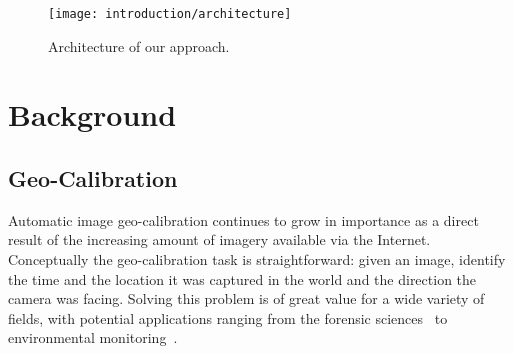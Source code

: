 \begin{figure}
  \centering
  \texttt{[image: introduction/architecture]}
  \caption{Architecture of our approach.}
  \label{fig:intro:architecture}
\end{figure}

\section{Background}

\subsection{Geo-Calibration}
%
Automatic image geo-calibration continues to grow in importance as a
direct result of the increasing amount of imagery available
via the Internet. Conceptually the geo-calibration task is
straightforward: given an image, identify the time and the location it
was captured in the world and the direction the camera was facing.
Solving this problem is of great value for a wide variety of fields,
with potential applications ranging from the forensic
sciences~\cite{stylianou13jane} to environmental
monitoring~\cite{zhang2012mining}.

